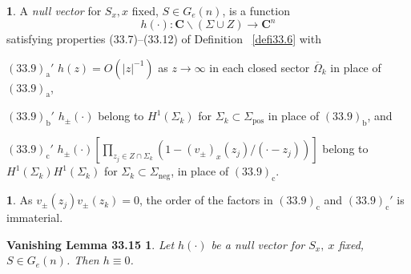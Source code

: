 \documentclass{surv-l}
\theoremstyle{plain}
\newtheorem*{vlem3315}{\sc Vanishing Lemma 33.15}
\theoremstyle{definition}
\newtheorem{remark}[theorem]{\sc{Remark}}
\newtheorem{definition}[theorem]{\sc{Definition}}
\numberwithin{equation}{chapter}
\begin{document}
\setcounter{theorem}{12}
\begin{definition}\label{defi33.13}
A \emph{null vector} for $S_{x}, x$ fixed, $S\in G_{e}(n)$, is a function
\begin{equation*}
h(\cdot):\mathbf{C}\backslash (\Sigma\cup Z)\rightarrow \mathbf{C}^{n}
\end{equation*}
satisfying properties (33.7)--(33.12) of Definition ~\ref{defi33.6} with

$(33.9)_{\mathrm{a}}'$ $h(z)=O(|z|^{-1})$ as $ z\rightarrow\infty$ in each closed sector $\overline{\Omega}_{k}$ in place of $(33.9)_{\mathrm{a}}$,

$(33.9)_{\mathrm{b}}'$ $h_{\pm}(\cdot)$ belong to $H^{1}(\Sigma_{k})$ for $\Sigma_{k}\subset\Sigma_{\mathrm{pos}}$ in place of $(33.9)_{\mathrm{b}}$, and

$(33.9)_{\mathrm{c}}'$ $h_{\pm}(\cdot)[\prod_{z_{j}\in Z\cap\Sigma_{k}}(1-(v_{\pm})_{x}(z_{j})/(\cdot-z_{j}))]$ belong to $H^{1}(\Sigma_{k})H^{1}(\Sigma_{k})$ for $\Sigma_{k}\subset\Sigma_{\mathrm{neg}}$, in place of $(33.9)_{\mathrm{c}}$.
\end{definition}

\begin{remark}\label{rem33.14}
As $v_{\pm}(z_{j})v_{\pm}(z_{k})=0$, the order of the factors in $(33.9)_{\mathrm{c}}$ and $(33.9)_{\mathrm{c}}'$ is immaterial.
\end{remark}

\begin{vlem3315}\label{vlem33.15}
Let $h(\cdot)$ be a null vector for $S_{x},\ x$ fixed, $ S\in G_{e}(n)$. Then $h\equiv 0$.
\end{vlem3315} 
\end{document}
